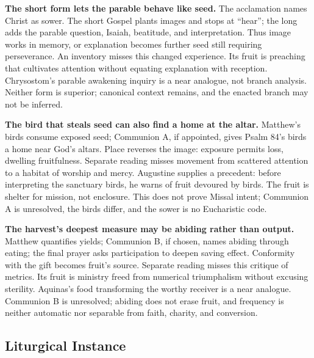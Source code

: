 \begin{deepstudy}
\noindent\textbf{The short form lets the parable behave like seed.\enspace{}}
The acclamation names Christ as sower. The short Gospel plants images and stops at “hear”; the long adds the parable question, Isaiah, beatitude, and interpretation. Thus image works in memory, or explanation becomes further seed still requiring perseverance. An inventory misses this changed experience. Its fruit is preaching that cultivates attention without equating explanation with reception. Chrysostom's parable awakening inquiry is a near analogue, not branch analysis. Neither form is superior; canonical context remains, and the enacted branch may not be inferred.

\noindent\textbf{The bird that steals seed can also find a home at the altar.\enspace{}}
Matthew's birds consume exposed seed; Communion A, if appointed, gives Psalm 84's birds a home near God's altars. Place reverses the image: exposure permits loss, dwelling fruitfulness. Separate reading misses movement from scattered attention to a habitat of worship and mercy. Augustine supplies a precedent: before interpreting the sanctuary birds, he warns of fruit devoured by birds. The fruit is shelter for mission, not enclosure. This does not prove Missal intent; Communion A is unresolved, the birds differ, and the sower is no Eucharistic code.

\noindent\textbf{The harvest's deepest measure may be abiding rather than output.\enspace{}}
Matthew quantifies yields; Communion B, if chosen, names abiding through eating; the final prayer asks participation to deepen saving effect. Conformity with the gift becomes fruit's source. Separate reading misses this critique of metrics. Its fruit is ministry freed from numerical triumphalism without excusing sterility. Aquinas's food transforming the worthy receiver is a near analogue. Communion B is unresolved; abiding does not erase fruit, and frequency is neither automatic nor separable from faith, charity, and conversion.

\clearpage

\pcresolutionappendix

\subsection*{Liturgical Instance}


\end{deepstudy}
